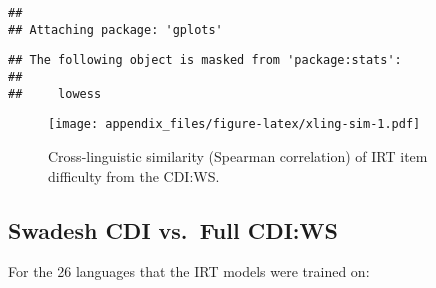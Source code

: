 \documentclass[
]{article}
\begin{document}
\begin{verbatim}
## 
## Attaching package: 'gplots'
\end{verbatim}

\begin{verbatim}
## The following object is masked from 'package:stats':
## 
##     lowess
\end{verbatim}

\begin{figure}
\centering
\texttt{[image: appendix\_files/figure-latex/xling-sim-1.pdf]}
\caption{Cross-linguistic similarity (Spearman correlation) of IRT item
difficulty from the CDI:WS.}
\end{figure}

\hypertarget{swadesh-cdi-vs.-full-cdiws}{%
\subsection{Swadesh CDI vs.~Full
CDI:WS}\label{swadesh-cdi-vs.-full-cdiws}}

For the 26 languages that the IRT models were trained on:
\end{document}
